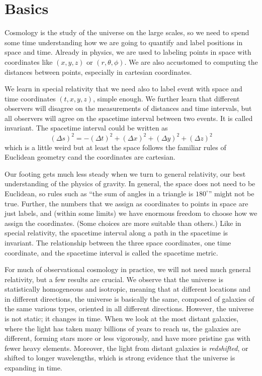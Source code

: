 \chapter{Basics}

Cosmology is the study of the universe on the large scales, so we need to spend some time understanding how we are going to quantify and label positions in space and time.  Already in physics, we are used to labeling points in space with coordinates like $(x,y,z)$ or $(r,\theta,\phi)$.  We are also accustomed to computing the distances between points, especially in cartesian coordinates.

We learn in special relativity that we need also to label event with space and time coordinates $(t,x,y,z)$, simple enough.  We further learn that different observers will disagree on the measurements of distances and time intervals, but all observers will agree on the spacetime interval between two events.  It is called invariant.  The spacetime interval could be written as
\begin{equation}
  (\Delta s)^2 = -(\Delta t)^2 +  (\Delta x)^2 + (\Delta y)^2 + (\Delta z)^2
\end{equation}
which is a little weird but at least the space follows the familiar rules of Euclidean geometry cand the coordinates are cartesian.

Our footing gets much less steady when we turn to general relativity, our best understanding of the physics of gravity.  In general, the space does not need to be Euclidean, so rules such as ``the sum of angles in a triangle is $180^\circ$'' might not be true.  Further, the numbers that we assign as coordinates to points in space are just labels, and (within some limits) we have enormous freedom to choose how we assign the coordinates.  (Some choices are more suitable than others.)  Like in special relativity, the spacetime interval along a path in the spacetime is invariant.  The relationship between the three space coordinates, one time coordinate, and the spacetime interval is called the spacetime metric.

For much of observational cosmology in practice, we will not need much general relativity, but a few results are crucial.  We observe that the universe is statistically homogeneous and isotropic, meaning that at different locations and in different directions, the universe is basically the same, composed of galaxies of the same various types, oriented in all different directions.  However, the universe is not static; it changes in time.  When we look at the most distant galaxies, where the light has taken many billions of years to reach us, the galaxies are different, forming stars more or less vigorously, and have more pristine gas with fewer heavy elements.  Moreover, the light from distant galaxies is \textit{redshifted}, or shifted to longer wavelengths, which is strong evidence that the universe is expanding in time.

